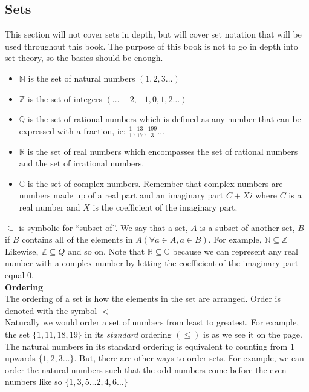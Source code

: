 \documentclass[a4paper,12pt]{article}
\begin{document}
\subsection{Sets}
\hspace{\parindent}This section will not cover sets in depth, but will cover set notation that will be used throughout this book. The purpose of this book is not to go in depth into set theory, so the basics should be enough.
\begin{itemize}
    \item $\mathbb{N}$ is the set of natural numbers $(1,2,3 \dots)$
    \item $\mathbb{Z}$ is the set of integers $(\dots -2,-1,0,1,2 \dots )$
    \item $\mathbb{Q}$ is the set of rational numbers which is defined as any number that can be expressed with a fraction, ie: $\frac{1}{1}, \frac{13}{17}, \frac{199}{3} \dots $
    \item $\mathbb{R}$ is the set of real numbers which encompasses the set of rational numbers and the set of irrational numbers.
    \item $\mathbb{C}$ is the set of complex numbers. Remember that complex numbers are numbers made up of a real part and an imaginary part $C + Xi$ where $C$ is a real number and $X$ is the coefficient of the imaginary part.
\end{itemize}
$\subseteq$ is symbolic for ``subset of''. We say that a set, $A$ is a subset of another set, $B$ if $B$ contains all of the elements in $A$\hspace{5pt}$(\forall a \in A, a \in B)$. For example, $\mathbb{N} \subseteq \mathbb{Z}$ Likewise, $\mathbb{Z} \subseteq {Q}$ and so on. Note that $\mathbb{R} \subseteq \mathbb{C}$ because we can represent any real number with a complex number by letting the coefficient of the imaginary part equal $0$.\bigskip\\
\textbf{Ordering}\medskip\\
\hspace*{\parindent}The ordering of a set is how the elements in the set are arranged. Order is denoted with the symbol $<$\\
\hspace*{\parindent}Naturally we would order a set of numbers from least to greatest. For example, the set $\{1, 11, 18, 19\}$ in its \textit{standard} ordering $(\leqslant)$ is as we see it on the page. The natural numbers in its standard ordering is equivalent to counting from $1$ upwards $\{1, 2,3 \dots\}$. But, there are other ways to order sets. For example, we can order the natural numbers such that the odd numbers come before the even numbers like so $\{1, 3, 5 \dots 2, 4, 6 \dots \}$\bigskip\\
\end{document}

